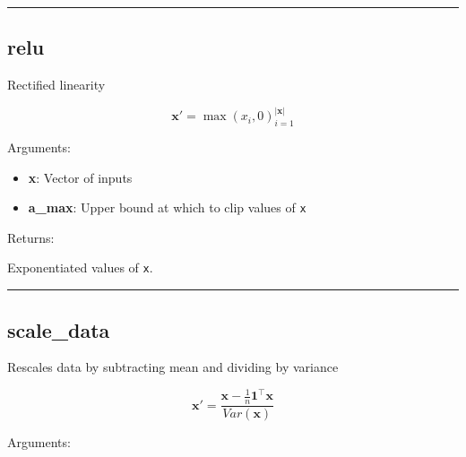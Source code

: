 \begin{center}\rule{0.5\linewidth}{\linethickness}\end{center}

\subsection{relu}\label{relu}

\begin{Shaded}
\begin{Highlighting}[]
\OperatorTok{=}\NormalTok{)}
\end{Highlighting}
\end{Shaded}

Rectified linearity

\[
\mathbf x' = \max (x_i, 0)_{i=1}^{|\mathbf x|}
\]

Arguments:

\begin{itemize}
\tightlist
\item
  \textbf{x}: Vector of inputs
\item
  \textbf{a\_max}: Upper bound at which to clip values of \texttt{x}
\end{itemize}

Returns:

Exponentiated values of \texttt{x}.

\begin{center}\rule{0.5\linewidth}{\linethickness}\end{center}

\subsection{scale\_data}\label{scale_data}

\begin{Shaded}
\begin{Highlighting}[]
\OperatorTok{=}\OperatorTok{=}\OperatorTok{=}\NormalTok{)}
\end{Highlighting}
\end{Shaded}

Rescales data by subtracting mean and dividing by variance

\[
\mathbf x' = \frac{\mathbf x - \frac{1}{n} \mathbf 1^\top \mathbf x}{Var(\mathbf x)}
\]

Arguments:

